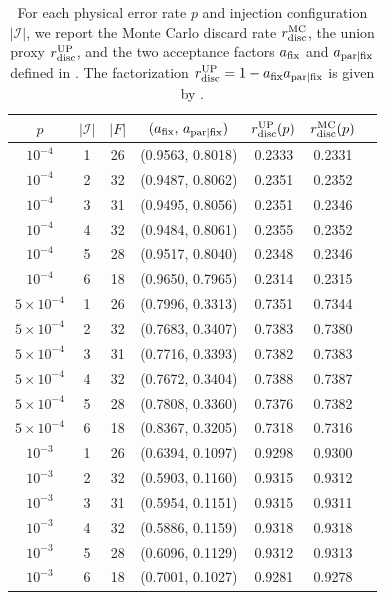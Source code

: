 \begin{table}[htb]
    \centering
    \begin{tabular}{ccccccc}
    \toprule
    $p$ & $|\mathcal{I}|$ & $|F|$    & $(a_{\rm fix},\, a_{{\rm par}\mid{\rm fix}})$ & $r_{\rm disc}^{\rm UP}(p)$ & $r_{\rm disc}^{\rm MC}(p)$ \\
    \midrule
$10^{-4}$ & 1 & 26 & (0.9563, 0.8018) & 0.2333 & 0.2331  \\
$10^{-4}$ & 2 & 32 & (0.9487, 0.8062) & 0.2351 & 0.2352  \\
$10^{-4}$ & 3 & 31 & (0.9495, 0.8056) & 0.2351 & 0.2346  \\
$10^{-4}$ & 4 & 32 & (0.9484, 0.8061) & 0.2355 & 0.2352  \\
$10^{-4}$ & 5 & 28 & (0.9517, 0.8040) & 0.2348 & 0.2346  \\
$10^{-4}$ & 6 & 18 & (0.9650, 0.7965) & 0.2314 & 0.2315  \\
\midrule
$5 \times 10^{-4}$ & 1 & 26 & (0.7996, 0.3313) & 0.7351 & 0.7344  \\
$5 \times 10^{-4}$ & 2 & 32 & (0.7683, 0.3407) & 0.7383 & 0.7380  \\
$5 \times 10^{-4}$ & 3 & 31 & (0.7716, 0.3393) & 0.7382 & 0.7383  \\
$5 \times 10^{-4}$ & 4 & 32 & (0.7672, 0.3404) & 0.7388 & 0.7387  \\
$5 \times 10^{-4}$ & 5 & 28 & (0.7808, 0.3360) & 0.7376 & 0.7382  \\
$5 \times 10^{-4}$ & 6 & 18 & (0.8367, 0.3205) & 0.7318 & 0.7316  \\
\midrule
$10^{-3}$ & 1 & 26 & (0.6394, 0.1097) & 0.9298 & 0.9300  \\
$10^{-3}$ & 2 & 32 & (0.5903, 0.1160) & 0.9315 & 0.9312  \\
$10^{-3}$ & 3 & 31 & (0.5954, 0.1151) & 0.9315 & 0.9311  \\
$10^{-3}$ & 4 & 32 & (0.5886, 0.1159) & 0.9318 & 0.9318  \\
$10^{-3}$ & 5 & 28 & (0.6096, 0.1129) & 0.9312 & 0.9313  \\
$10^{-3}$ & 6 & 18 & (0.7001, 0.1027) & 0.9281 & 0.9278  \\
    \bottomrule
    \end{tabular}
    \caption{For each physical error rate $p$ and injection configuration $|\mathcal{I}|$, we report the Monte Carlo discard rate $r_{\rm disc}^{\rm MC}$, the union proxy $r_{\rm disc}^{\rm UP}$, and the two acceptance factors $a_{\rm fix}$ and $a_{{\rm par}\mid{\rm fix}}$ defined in . The factorization \(r_{\rm disc}^{\rm UP}=1-a_{\rm fix}a_{{\rm par}\mid{\rm fix}}\) is given by .}
    \label{tab:discard_components}
\end{table}


